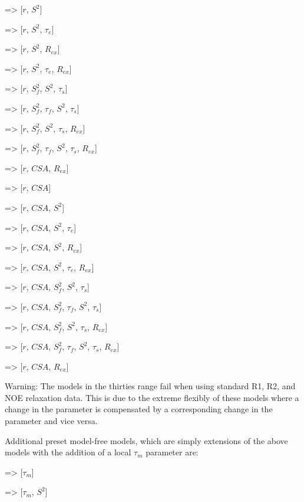    => [$r$, $S^2$]
    
   => [$r$, $S^2$, $\tau_e$]
    
   => [$r$, $S^2$, $R_{ex}$]
    
   => [$r$, $S^2$, $\tau_e$, $R_{ex}$]
    
   => [$r$, $S^2_f$, $S^2$, $\tau_s$]
    
   => [$r$, $S^2_f$, $\tau_f$, $S^2$, $\tau_s$]
    
   => [$r$, $S^2_f$, $S^2$, $\tau_s$, $R_{ex}$]
    
   => [$r$, $S^2_f$, $\tau_f$, $S^2$, $\tau_s$, $R_{ex}$]
    
   => [$r$, $CSA$, $R_{ex}$]

    
   => [$r$, $CSA$]
    
   => [$r$, $CSA$, $S^2$]
    
   => [$r$, $CSA$, $S^2$, $\tau_e$]
    
   => [$r$, $CSA$, $S^2$, $R_{ex}$]
    
   => [$r$, $CSA$, $S^2$, $\tau_e$, $R_{ex}$]
    
   => [$r$, $CSA$, $S^2_f$, $S^2$, $\tau_s$]
    
   => [$r$, $CSA$, $S^2_f$, $\tau_f$, $S^2$, $\tau_s$]
    
   => [$r$, $CSA$, $S^2_f$, $S^2$, $\tau_s$, $R_{ex}$]
    
   => [$r$, $CSA$, $S^2_f$, $\tau_f$, $S^2$, $\tau_s$, $R_{ex}$]
    
   => [$r$, $CSA$, $R_{ex}$]

Warning:  The models in the thirties range fail when using standard R1, R2, and NOE
relaxation data.  This is due to the extreme flexibly of these models where a change in the
parameter 
 is compensated by a corresponding change in the parameter 
 and
vice versa.


Additional preset model-free models, which are simply extensions of the above models with
the addition of a local $\tau_m$ parameter are:
    
   => [$\tau_m$]
    
   => [$\tau_m$, $S^2$]
    
